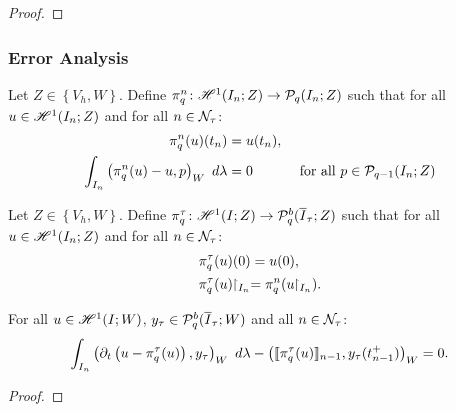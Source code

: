 \begin{proof}
        
\end{proof}

\subsubsection{Error Analysis}

\begin{definition}[$\InterpolantQN$]
    Let $Z \in \left\{V_h, W\right\}$. Define $\pi^n_q \colon \mathscr{H}^{1}(I_n; Z) \rightarrow \mathcal{P}_{q}(I_n; Z)$ such that for all $u \in \mathscr{H}^{1}(I_n; Z)$ and for all $n \in \mathcal{N}_{\tau}$:
    \begin{align}
        \pi^n_q(u)(t_n) & = u(t_n), \\
        \int_{I_n} \left( \pi^n_q(u) - u, p \right)_W ~ d \lambda &= 0 &\text{ for all } p \in \mathcal{P}_{q - 1}(I_n; Z)
    \end{align}
\end{definition}

\begin{definition}[$\InterpolantQT$]
    Let $Z \in \left\{V_h, W\right\}$. Define $\pi^{\tau}_q \colon \mathscr{H}^{1}(I; Z) \rightarrow \mathcal{P}_{q}^b(\overline{I}_{\tau}; Z)$ such that for all $u \in \mathscr{H}^{1}(I_n; Z)$ and for all $n \in \mathcal{N}_{\tau}$:
    \begin{align}
        & \pi^{\tau}_q(u)(0) = u(0), \\
        & \pi^{\tau}_q(u) \!\!\restriction_{I_n} = \pi^n_q(u \!\!\restriction_{I_n}).
    \end{align}
\end{definition}

\begin{lemma}[Orthogonality]
    For all $u \in \mathscr{H}^{1}(I; W)$, $y_{\tau} \in \mathcal{P}_{q}^b(\overline{I}_{\tau}; W)$ and all $n \in \mathcal{N}_{\tau}$:
    \begin{align}
        \int_{I_n} \left( \partial_t \left( u - \pi^{\tau}_q(u) \right), y_{\tau} \right)_W ~ d \lambda - \left( \llbracket \pi^{\tau}_q(u) \rrbracket_{n - 1}, y_{\tau}(t_{n - 1}^+) \right)_W = 0.
    \end{align}
\end{lemma}

\begin{proof}
        
\end{proof}

